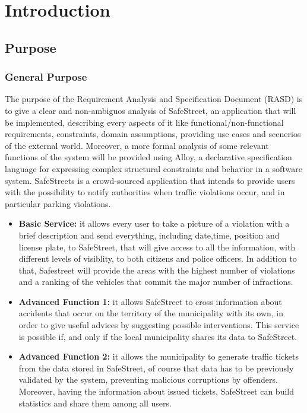 \documentclass[a4paper, hidelinks, 12pt]{report}
\begin{document}
	\chapter{Introduction}\label{ch:introduction}
	\section{Purpose}\label{sec:purpose}
        \subsection{General Purpose}\label{subsec:general-purpose}
            The purpose of the Requirement Analysis and Specification Document (RASD) is to give a clear and non-ambiguos analysis of SafeStreet, an application that will be implemented, describing every aspects of it like functional/non-functional requirements, constraints, domain assumptions, providing use cases and scenerios of the external world. Moreover, a more formal analysis of some relevant functions of the system will be provided using Alloy, a declarative specification language for expressing complex structural constraints and behavior in a software system.
            SafeStreets is a crowd-sourced application that intends to provide users with the possibility to notify authorities when traffic violations occur, and in particular parking violations.
            \begin{itemize}
                \item \textbf{Basic Service:}
                it allows every user to take a picture of a violation with a brief description and send everything, including date,time, position and license plate, to SafeStreet, that will give access to all the information, with different levels of visiblity, to both citizens and police officers. In addition to that, Safestreet will provide the areas with the highest number of violations and a ranking of the vehicles that commit the major number of infractions.
                \item \textbf{Advanced Function 1:}
                it allows SafeStreet to cross information about accidents that occur on the territory of the municipality with its own, in order to give useful advices by suggesting possible interventions. This service is possible if, and only if the local municipality shares its data to SafeStreet.
                \item \textbf{Advanced Function 2:}
                it allows the municipality to generate traffic tickets from the data stored in SafeStreet, of course that data has to be previously validated by the system, preventing malicious corruptions by offenders. Moreover, having the information about issued tickets, SafeStreet can build statistics and share them among all users.
            \end{itemize}
\end{document}
